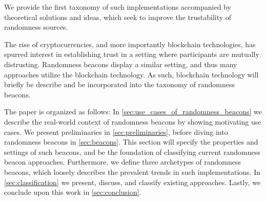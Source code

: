 We provide the first taxonomy of such implementations accompanied by theoretical solutions and ideas, which seek to improve the trustability of randomness sources.

The rise of cryptocurrencies, and more importantly blockchain technologies, has spurred interest in establishing trust in a setting where participants are mutually distrusting.
Randomness beacons display a similar setting, and thus many approaches utilize the blockchain technology.
As such, blockchain technology will briefly be describe and be incorporated into the taxonomy of randomness beacons.

The paper is organized as follows:
In \cref{sec:use_cases_of_randomness_beacons} we describe the real-world context of randomness beacons by showing motivating use cases.
We present preliminaries in \cref{sec:preliminaries}, before diving into randomness beacons in \cref{sec:beacons}.
This section will specify the properties and settings of such beacons, and be the foundation of classifying current randomness beacon approaches.
Furthermore, we define three archetypes of randomness beacons, which loosely describes the prevalent trends in such implementations.
In \cref{sec:classification} we present, discuss, and classify existing approaches.
Lastly, we conclude upon this work in \cref{sec:conclusion}.


